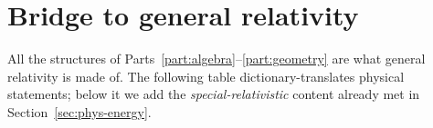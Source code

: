 \section{Bridge to general relativity}\label{sec:bridge}

All the structures of Parts~\ref{part:algebra}--\ref{part:geometry} are what general relativity is made of. %
The following table dictionary-translates physical statements; below it we add the
\emph{special-relativistic} content already met in Section~\ref{sec:phys-energy}.


